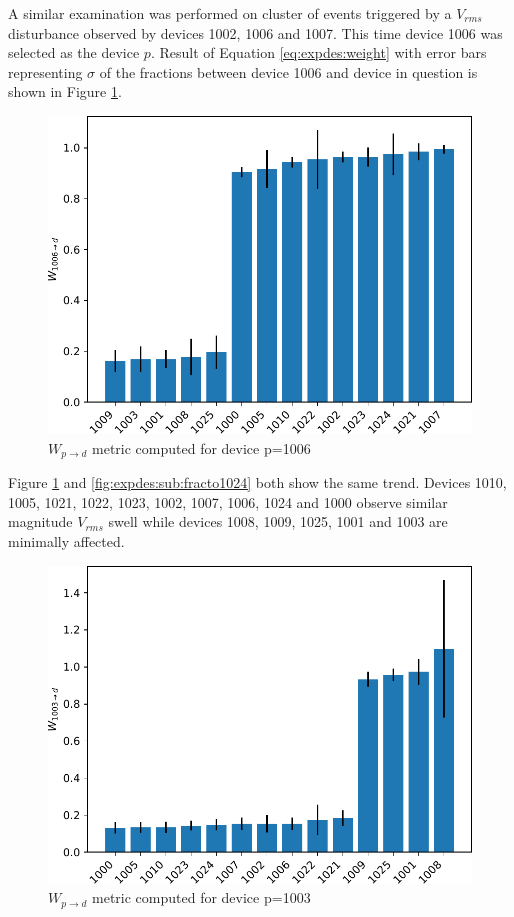 A similar examination was performed on cluster of events triggered by a $V_{rms}$ disturbance observed by devices 1002, 1006 and 1007.
This time device 1006 was selected as the device $p$.
Result of Equation \ref{eq:expdes:weight} with error bars representing  $\sigma$ of the fractions between device 1006 and device in question is shown in Figure \ref{fig:expdes:sub:fracto1006}.

\begin{figure}[ht!]
    \centering
    \includegraphics[width=0.8\linewidth]{img/napali_eval/subthreshold/clustering/1006toall.pdf}
    \caption{$W_{p \rightarrow d}$ metric computed for device p=1006}
    \label{fig:expdes:sub:fracto1006}
\end{figure}

Figure \ref{fig:expdes:sub:fracto1006} and \ref{fig:expdes:sub:fracto1024} both show the same trend.
Devices 1010, 1005, 1021, 1022, 1023, 1002, 1007, 1006, 1024 and 1000 observe similar magnitude $V_{rms}$ swell while devices 1008, 1009, 1025, 1001 and 1003 are minimally affected.

\begin{figure}[ht!]
    \centering
    \includegraphics[width=0.8\linewidth]{img/napali_eval/subthreshold/clustering/1003toall.pdf}
    \caption{$W_{p \rightarrow d}$ metric computed for device p=1003}
    \label{fig:expdes:sub:fracto1003}
\end{figure}

